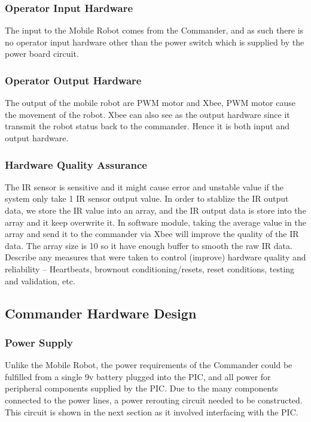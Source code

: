 \documentclass[11pt,a4paper]{article}
\begin{document}
    \subsubsection{Operator Input Hardware}
      The input to the Mobile Robot comes from the Commander, and as such there is no operator input hardware other than the power switch which is supplied by the power board circuit.
    \subsubsection{Operator Output Hardware}
    The output of the mobile robot are PWM motor and Xbee, PWM motor cause the movement of the robot. Xbee can also see as the output hardware since it transmit the robot status back to the commander. Hence it is both input and output hardware.
    \subsubsection{Hardware Quality Assurance}
      The IR sensor is sensitive and it might cause error and unstable value if the system only take 1 IR sensor output value. In order to stablize the IR output data, we store the IR value into an array, and the IR output data is store into the array and it keep overwrite it. In software module, taking the average value in the array and send it to the commander via Xbee will improve the quality of the IR data. The array size is 10 so it have enough buffer to smooth the raw IR data.\\

    Describe any measures that were taken to control (improve) hardware quality and reliability – Heartbeats, brownout conditioning/resets, reset conditions, testing and validation, etc.

  \subsection{Commander Hardware Design}
    \subsubsection{Power Supply}
      Unlike the Mobile Robot, the power requirements of the Commander could be fulfilled from a single 9v battery plugged into the PIC, and all power for peripheral components supplied by the PIC. Due to the many components connected to the power lines, a power rerouting circuit needed to be constructed. This circuit is shown in the next section as it involved interfacing with the PIC.
\end{document}
